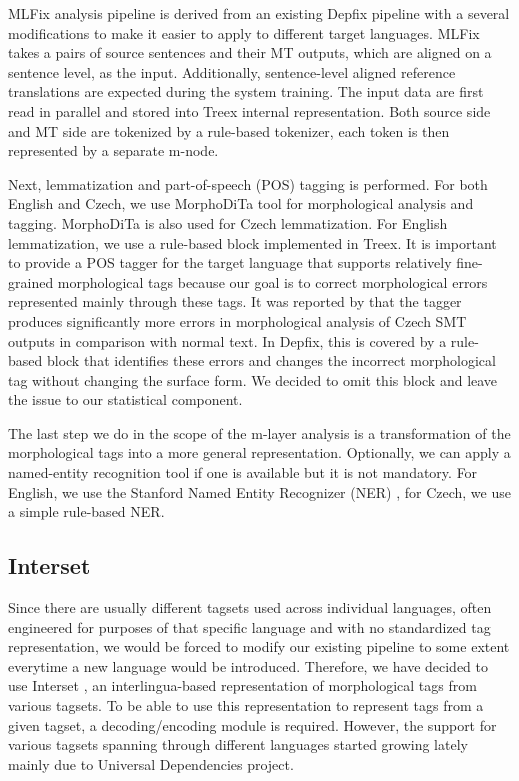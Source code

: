 MLFix analysis pipeline is derived from an existing Depfix pipeline
with a several modifications to make it easier to apply to different
target languages. MLFix takes a pairs of source sentences and their MT outputs, which
are aligned on a sentence level, as the input. Additionally, sentence-level aligned reference
translations are expected during the system training.
The input data are first read in parallel and stored into Treex internal representation.
Both source side and MT side are tokenized by a rule-based tokenizer, each token is then
represented by a separate m-node.

Next, lemmatization and part-of-speech (POS) tagging is performed.
For both English and Czech, we use MorphoDiTa \citep{strakova14:morphodita}
tool for morphological analysis and tagging. MorphoDiTa is also used for Czech lemmatization.
For English lemmatization, we use a rule-based block implemented in Treex.
It is important to provide a POS tagger for the target language that supports
relatively fine-grained morphological tags because our goal is to correct morphological
errors represented mainly through these tags.
It was reported by \citet[p. 33]{biblio:RoAutomaticpostediting2013} that the tagger produces significantly more
errors in morphological analysis of Czech SMT outputs in comparison with normal text. In Depfix, this is covered
by a rule-based block that identifies these errors and changes the incorrect morphological tag without
changing the surface form. We decided to omit this block and leave the issue to our statistical
component.

The last step we do in the scope of the m-layer analysis is a transformation of the morphological tags into
a more general representation. Optionally, we can apply a named-entity recognition
tool if one is available but it is not mandatory. For English, we use the Stanford
Named Entity Recognizer (NER) \citep{Finkel:2005:INI:1219840.1219885},
for Czech, we use a simple rule-based NER. 

\subsection{Interset}

Since there are usually different tagsets used across individual languages,
often engineered for purposes of that specific language and with no standardized
tag representation,
we would be forced to modify our existing pipeline to some extent everytime
a new language would be introduced.
Therefore, we have decided to use Interset \citep{biblio:ZeReusableTagset2008}, an interlingua-based
representation of morphological tags from various tagsets. To be able to use this
representation to represent tags from a given tagset, a decoding/encoding
module is required. However, the support for various tagsets spanning
through different languages started growing lately mainly due to Universal Dependencies \citep{universal-dep:2016} project.

